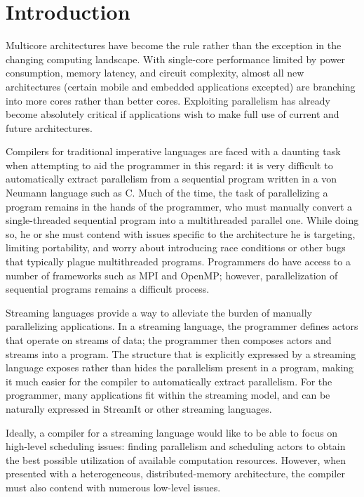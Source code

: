 \section{Introduction}

Multicore architectures have become the rule rather than the exception in the changing computing landscape. With single-core performance limited by power consumption, memory latency, and circuit complexity, almost all new architectures (certain mobile and embedded applications excepted) are branching into more cores rather than better cores. Exploiting parallelism has already become absolutely critical if applications wish to make full use of current and future architectures.

Compilers for traditional imperative languages are faced with a daunting task when attempting to aid the programmer in this regard: it is very difficult to automatically extract parallelism from a sequential program written in a von Neumann language such as C. Much of the time, the task of parallelizing a program remains in the hands of the programmer, who must manually convert a single-threaded sequential program into a multithreaded parallel one. While doing so, he or she must contend with issues specific to the architecture he is targeting, limiting portability, and worry about introducing race conditions or other bugs that typically plague multithreaded programs. Programmers do have access to a number of frameworks such as MPI and OpenMP; however, parallelization of sequential programs remains a difficult process.

Streaming languages provide a way to alleviate the burden of manually parallelizing applications. In a streaming language, the programmer defines actors that operate on streams of data; the programmer then composes actors and streams into a program. The structure that is explicitly expressed by a streaming language exposes rather than hides the parallelism present in a program, making it much easier for the compiler to automatically extract parallelism. For the programmer, many applications fit within the streaming model, and can be naturally expressed in StreamIt or other streaming languages.

Ideally, a compiler for a streaming language would like to be able to focus on high-level scheduling issues: finding parallelism and scheduling actors to obtain the best possible utilization of available computation resources. However, when presented with a heterogeneous, distributed-memory architecture, the compiler must also contend with numerous low-level issues.

